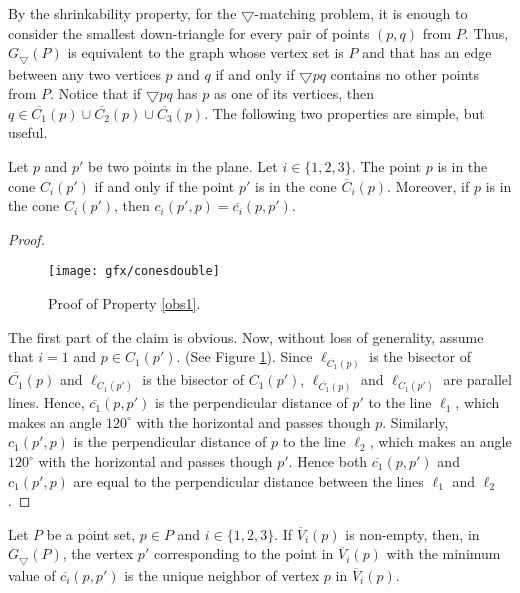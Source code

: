 By the shrinkability property, for the $\bigtriangledown$-matching problem, it is enough to consider the smallest down-triangle for every pair of 
points $(p,q)$ from $P$. Thus, $G_{\bigtriangledown}(P)$ is equivalent to the graph whose vertex set is $P$ and that has an edge between any two 
vertices $p$ and $q$ if and only if $\bigtriangledown pq$ contains no other points from $P$. Notice that if $\bigtriangledown pq$ has $p$ as one 
of its vertices, then $q \in \overline{C_1}(p) \cup \overline{C_2}(p) \cup \overline{C_3}(p)$. The following two properties are simple, but useful.
\begin{property}\label{obs1}
 Let $p$ and $p'$ be two points in the plane. Let $i \in \{1, 2, 3\}$. The point $p$ is in the cone $C_i(p')$ if and only if the point $p'$ is in 
the cone $\overline{C}_i(p)$. Moreover, if $p$ is in the cone $C_i(p')$, then ${c_i}(p', p)=\overline{c_i}(p, p')$.
\end{property}
\begin{proof}
\begin{figure}
\centering
  \texttt{[image: gfx/conesdouble]}   %
  \caption{Proof of Property \ref{obs1}.}
\label{Figcones2}
  \end{figure}
 The first part of the claim is obvious. Now, without loss of generality, assume that $i=1$ and $p \in C_1(p')$. (See Figure \ref{Figcones2}). 
Since $\ell_{\overline{C_1}(p)}$ is the bisector of $\overline{C_1}(p)$ and $\ell_{C_1(p')}$ is the bisector of $C_1(p')$, $\ell_{\overline{C_1}(p)}$ 
and $\ell_{C_1(p')}$ are parallel lines. Hence, $\overline{c_1}(p, p')$ is the perpendicular distance of $p'$ to the line $\ell_1$, which makes an angle 
$120^{\circ}$ with the horizontal and passes though $p$. Similarly, ${c_1}(p', p)$ is the perpendicular distance of $p$ to the line $\ell_2$, which makes 
an angle $120^{\circ}$ with the horizontal and passes though $p'$. Hence both $\overline{c_1}(p, p')$ and ${c_1}(p', p)$ are equal to the perpendicular distance between the lines 
$\ell_1$ and $\ell_2$.
\end{proof}
\begin{property}\label{obs2}
Let $P$ be a point set, $p \in P$ and $i \in \{1, 2, 3\}$. If $\overline{V}_i(p)$ is non-empty, then, 
in $G_\bigtriangledown(P)$, the vertex $p'$ corresponding to the point in $\overline{V}_i(p)$ 
with the minimum value of $\overline{c_i}(p, p')$ is the unique neighbor of vertex $p$ in $\overline{V}_i(p)$. 
\end{property}
